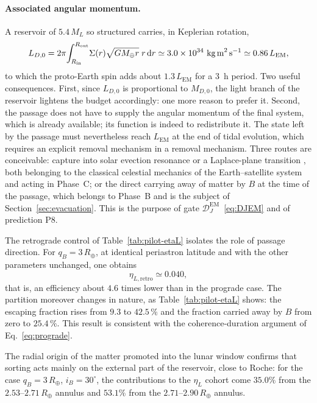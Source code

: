 \documentclass[11pt,a4paper,openany]{report}
\newcommand{\Mt}{M_{\oplus}}
\newcommand{\Rt}{R_{\oplus}}
\newcommand{\dd}{\mathrm{d}}
\begin{document}
\paragraph{Associated angular momentum.}
A reservoir of $5.4\,M_L$ so structured carries, in Keplerian rotation,
\begin{equation}
L_{D,0}=2\pi\!\int_{R_{\mathrm{in}}}^{R_{\mathrm{out}}}\!\Sigma(r)\sqrt{G\Mt r}\;r\,\dd r
\simeq3.0\times10^{34}\ \text{kg\,m}^2\,\text{s}^{-1}\simeq0.86\,L_{\mathrm{EM}},
\label{eq:LD-reservoir}
\end{equation}
to which the proto-Earth spin adds about $1.3\,L_{\mathrm{EM}}$ for a $3$~h period. Two useful
consequences. First, since $L_{D,0}$ is proportional to $M_{D,0}$, the light branch of the
reservoir lightens the budget accordingly: one more reason to prefer it. Second, the passage does
not have to supply the angular momentum of the final system, which is already available; its
function is indeed to redistribute it. The state left by the passage must nevertheless reach
$L_{\mathrm{EM}}$ at the end of tidal evolution, which requires an explicit removal mechanism in
a removal mechanism. Three routes are conceivable: capture into solar evection resonance or a
Laplace-plane transition \cite{MurrayDermott1999,TremaineTouma2009}, both belonging to the classical
celestial mechanics of the Earth--satellite system and acting in Phase~C; or the direct carrying
away of matter by $B$ at the time of the passage, which belongs to Phase~B and is the subject of
Section~\ref{sec:evacuation}. This is the purpose of gate
$\mathcal{D}_J^{\mathrm{EM}}$~\eqref{eq:DJEM} and of prediction P8.

The retrograde control of Table~\ref{tab:pilot-etaL} isolates the role of passage direction. For $q_B=3\,\Rt$, at identical
periastron latitude and with the other parameters unchanged, one obtains
\begin{equation}
\eta_{L,\mathrm{retro}}\simeq0.040,
\label{eq:retro-pilot}
\end{equation}
that is, an efficiency about $4.6$ times lower than in the prograde case. The partition moreover
changes in nature, as Table~\ref{tab:pilot-etaL} shows: the escaping fraction rises from $9.3$ to
$42.5\,\%$ and the fraction carried away by $B$ from zero to $25.4\,\%$. This result is consistent
with the coherence-duration argument of Eq.~\eqref{eq:prograde}.

The radial origin of the matter promoted into the lunar window confirms that sorting acts mainly
on the external part of the reservoir, close to Roche: for the case $q_B=3\,\Rt$, $i_B=30^\circ$,
the contributions to the $\eta_L$ cohort come $35.0\%$ from the $2.53$--$2.71\,\Rt$ annulus and
$53.1\%$ from the $2.71$--$2.90\,\Rt$ annulus.
\end{document}
